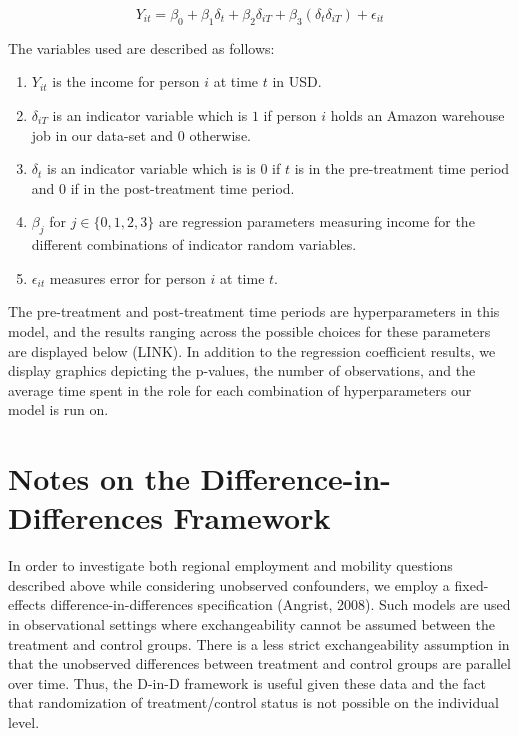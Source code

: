 \documentclass[11pt]{article}
\begin{document}
$$Y_{it} = \beta_0 + \beta_1\delta_{t} + \beta_2\delta_{iT} + \beta_3(\delta_t\delta_{iT}) + \epsilon_{it}$$

The variables used are described as follows: 

\begin{enumerate}
    \item $Y_{it}$ is the income for person $i$ at time $t$ in USD.
    \item $\delta_{iT}$ is an indicator variable which is $1$ if person $i$ holds an Amazon warehouse job in our data-set and $0$ otherwise.
    \item $\delta_{t}$ is an indicator variable which is is $0$ if $t$ is in the pre-treatment time period and $0$ if in the post-treatment time period.
    \item $\beta_j$ for $j\in \{0,1,2,3\}$ are regression parameters measuring income for the different combinations of indicator random variables.
    \item $\epsilon_{it}$ measures error for person $i$ at time $t$.
\end{enumerate}

The pre-treatment and post-treatment time periods are hyperparameters in this model, and the results ranging across the possible choices for these parameters are displayed below (LINK). In addition to the regression coefficient results, we display graphics depicting the p-values, the number of observations, and the average time spent in the role for each combination of hyperparameters our model is run on.

\section{Notes on the Difference-in-Differences Framework}
\-\hspace{0.5cm} In order to investigate both regional employment and mobility questions described above while considering unobserved confounders, we employ a fixed-effects difference-in-differences specification (Angrist, 2008). Such models are used in observational settings where exchangeability cannot be assumed between the treatment and control groups. There is a less strict exchangeability assumption in that the unobserved differences between treatment and control groups are parallel over time. Thus, the D-in-D framework is useful given these data and the fact that randomization of treatment/control status is not possible on the individual level.
\end{document}
